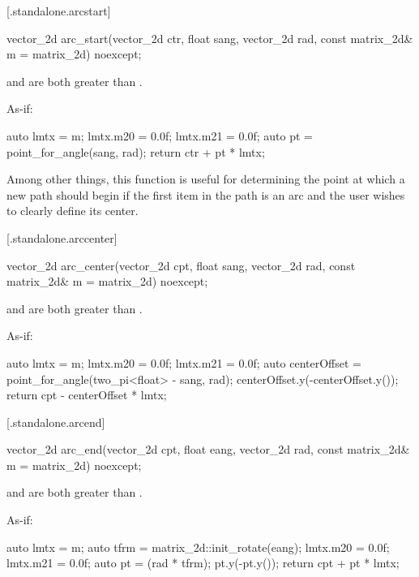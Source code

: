  [\iotwod.standalone.arcstart] {}

%
\begin{itemdecl}
vector_2d arc_start(vector_2d ctr, float sang, vector_2d rad, 
  const matrix_2d& m = matrix_2d{}) noexcept;
\end{itemdecl}
\begin{itemdescr}
\pnum
\requires
{} and  are both greater than .

\pnum
\returns
As-if:
\begin{codeblock}
auto lmtx = m;
lmtx.m20 = 0.0f; lmtx.m21 = 0.0f;
auto pt = point_for_angle(sang, rad);
return ctr + pt * lmtx;
\end{codeblock}

\pnum
\begin{note}
Among other things, this function is useful for determining the point at which a new path should begin if the first item in the path is an arc and the user wishes to clearly define its center.
\end{note}
\end{itemdescr}

 [\iotwod.standalone.arccenter] {}

%
\begin{itemdecl}
vector_2d arc_center(vector_2d cpt, float sang, vector_2d rad, 
  const matrix_2d& m = matrix_2d{}) noexcept;
\end{itemdecl}
\begin{itemdescr}
\pnum
\requires
{} and  are both greater than .

\pnum
\returns
As-if:
\begin{codeblock}
auto lmtx = m;
lmtx.m20 = 0.0f; lmtx.m21 = 0.0f;
auto centerOffset = point_for_angle(two_pi<float> - sang, rad);
centerOffset.y(-centerOffset.y());
return cpt - centerOffset * lmtx;
\end{codeblock}
\end{itemdescr}

 [\iotwod.standalone.arcend] {}

%
\begin{itemdecl}
vector_2d arc_end(vector_2d cpt, float eang, vector_2d rad, 
  const matrix_2d& m = matrix_2d{}) noexcept;
\end{itemdecl}
\begin{itemdescr}
\pnum
\requires
{} and  are both greater than .

\pnum
\returns
As-if:
\begin{codeblock}
auto lmtx = m;
auto tfrm = matrix_2d::init_rotate(eang);
lmtx.m20 = 0.0f; lmtx.m21 = 0.0f;
auto pt = (rad * tfrm);
pt.y(-pt.y());
return cpt + pt * lmtx;
\end{codeblock}
\end{itemdescr}
